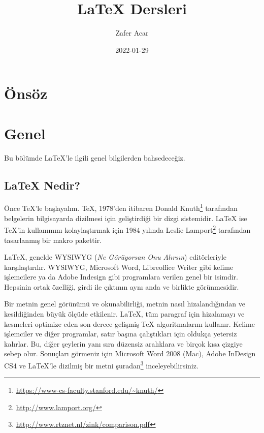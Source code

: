 \documentclass[
  10pt,
]{scrbook}
\title{LaTeX Dersleri}
\author{Zafer Acar}
\date{2022-01-29}
\renewcommand{\href}[2]{#2\footnote{\url{#1}}}
\theoremstyle{definition}
\theoremstyle{definition}
\theoremstyle{definition}
\theoremstyle{definition}
\theoremstyle{remark}
\begin{document}
\maketitle

\newcommand{\insvg}{\begingroup%
\renewcommand{\includegraphics}{}%
\noindent\rule{\textwidth}{1pt}%
}%
\newcommand{\outsvg}{%
\\\noindent\rule{\textwidth}{1pt}%
\endgroup%
}%

{
\setcounter{tocdepth}{2}
\tableofcontents
}
\listoffigures
\listoftables
\hypertarget{uxf6nsuxf6z}{%
\chapter*{Önsöz}\label{uxf6nsuxf6z}}

\mainmatter

\hypertarget{genel}{%
\chapter{Genel}\label{genel}}

Bu bölümde LaTeX'le ilgili genel bilgilerden bahsedeceğiz.

\hypertarget{latex-nedir}{%
\section{LaTeX Nedir?}\label{latex-nedir}}

Önce TeX'le başlayalım. TeX, 1978'den itibaren \href{https://www-cs-faculty.stanford.edu/~knuth/}{Donald Knuth} tarafından belgelerin bilgisayarda dizilmesi için geliştirdiği bir dizgi sistemidir. LaTeX ise TeX'in kullanımını kolaylaştırmak için 1984 yılında \href{http://www.lamport.org/}{Leslie Lamport} tarafından tasarlanmış bir makro pakettir.

LaTeX, genelde WYSIWYG (\emph{Ne Görüyorsan Onu Alırsın}) editörleriyle karşılaştırılır. WYSIWYG, Microsoft Word, Libreoffice Writer gibi kelime işlemcilere ya da Adobe Indesign gibi programlara verilen genel bir isimdir. Hepsinin ortak özelliği, girdi ile çıktının aynı anda ve birlikte görünmesidir.

Bir metnin genel görünümü ve okunabilirliği, metnin nasıl hizalandığından ve kesildiğinden büyük ölçüde etkilenir. LaTeX, tüm paragraf için hizalamayı ve kesmeleri optimize eden son derece gelişmiş TeX algoritmalarını kullanır. Kelime işlemciler ve diğer programlar, satır başına çalıştıkları için oldukça yetersiz kalırlar. Bu, diğer şeylerin yanı sıra düzensiz aralıklara ve birçok kısa çizgiye sebep olur. Sonuçları görmeniz için Microsoft Word 2008 (Mac), Adobe InDesign CS4 ve LaTeX'le dizilmiş bir metni \href{http://www.rtznet.nl/zink/comparison.pdf}{şuradan} inceleyebilirsiniz.
\end{document}
